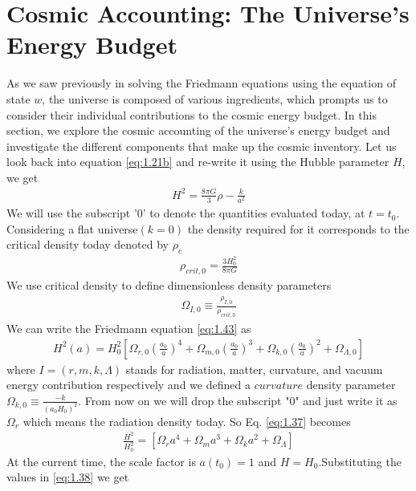 \section{Cosmic Accounting: The Universe's Energy Budget} \label{section 1.4}
\hspace{0.5cm}As we saw previously in solving the Friedmann equations using the equation of state $w$, the universe is composed of various ingredients, which prompts us to consider their individual contributions to the cosmic energy budget. 
In this section, we explore the cosmic accounting of the universe's energy budget and investigate the different components that make up the cosmic inventory.
Let us look back into equation  \ref{eq:1.21b} and re-write it using the Hubble parameter $H$, we get
\begin{align}
    H^2 = \frac{8 \pi G}{3} \rho - \frac{k}{a^2} \label{eq:1.43}
\end{align}
We will use the subscript '0' to denote the quantities evaluated today, at $t= t_0$. Considering a flat universe$(k = 0)$ the density required for it corresponds to the critical density today denoted by $\rho_c$
\begin{align}
    \rho_{crit,0} =\frac{3H_{0}^{2}}{8\pi G} \label{eq:1.35}
\end{align}
We use critical density to define dimensionless density parameters
\begin{align}
    \Omega_{I,0} \equiv \frac{\rho_{I,0}}{\rho_{crit,0}}\label{eq:1.36}
\end{align}
We can write the Friedmann equation \ref{eq:1.43} as
\begin{align}
    H^2(a) = H_{0}^2 \left[\Omega_{r,0}\left(\frac{a_0}{a}\right)^4 + \Omega_{m,0}\left(\frac{a_0}{a}\right)^3 + \Omega_{k,0}\left(\frac{a_0}{a}\right)^2 +\Omega_{\Lambda,0}\right] \label{eq:1.37}
\end{align}
where $I = (r,m,k,\Lambda)$ stands for radiation, matter, curvature, and vacuum energy contribution respectively and we defined a $curvature$ density parameter $ \Omega_{k,0} \equiv \frac{-k}{(a_0H_0)^2}$. From now on we will drop the subscript "0" and just write it as  $\Omega_{r}$ which means the radiation density today. So Eq. \ref{eq:1.37} becomes
\begin{align}
     \frac{H^2}{H_{0}^2} = [\Omega_{r}a^4 + \Omega_{m}a^3 + \Omega_{k}a^2 +\Omega_{\Lambda}] \label{eq:1.38}
\end{align}
At the current time, the scale factor is $a(t_0) = 1$ and $H =H_0$.Substituting the values in \ref{eq:1.38} we get
